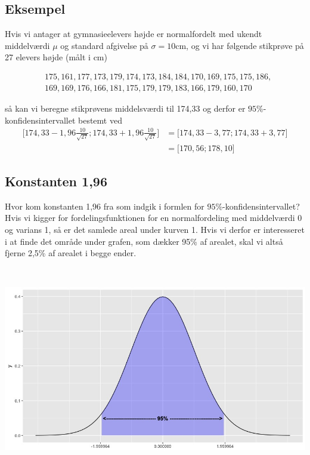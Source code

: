 \subsection{Eksempel}
Hvis vi antager at gymnasieelevers højde er normalfordelt med ukendt middelværdi \(\mu\) og standard afgivelse på \(\sigma=10\mbox{cm}\), og vi har følgende stikprøve på 27 elevers højde (målt i cm)

\begin{align*}
  &175, 161, 177, 173, 179, 174, 173, 184, 184, 170, 169, 175, 175, 186, \\
  &169, 169, 176, 166, 181, 175, 179, 179, 183, 166, 179, 160, 170
\end{align*}

så kan vi beregne stikprøvens middelsværdi til 174,33 og derfor er \(95\%\)-kon\-fi\-dens\-in\-ter\-val\-let bestemt ved
\begin{align*}
  \Big[174,33 - 1,96 \frac{10}{\sqrt{27}}; 174,33 + 1,96 \frac{10}{\sqrt{27}} \Big]
  &=\Big[174,33 - 3,77 ; 174,33 + 3,77 \Big] \\&= \Big[ 170,56; 178,10\Big]
\end{align*}

\subsection{Konstanten 1,96}
Hvor kom konstanten 1,96 fra som indgik i formlen for
\(95\%\)-konfidens\-in\-ter\-val\-let? Hvis vi kigger for fordelingsfunktionen for
en normalfordeling med middelværdi 0 og varians 1, så er det samlede areal under
kurven 1. Hvis vi derfor er interesseret i at finde det område under grafen, som
dækker 95\% af arealet, skal vi altså fjerne 2,5\% af arealet i begge ender.

\begin{center}
\includegraphics[height=9cm]{konfidensintervaller/images/Rplot01.JPG}
\end{center}

